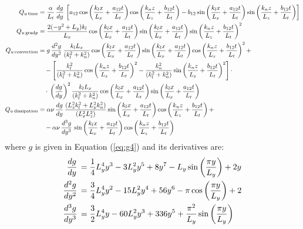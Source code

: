 \documentclass[10pt]{article}
\newcommand{\convection}{\,\text{convection}}
\newcommand{\gradp}{\,\text{grad}p}
\newcommand{\dissipation}{\,\text{dissipation}}
\begin{document}
\begin{equation*}
\begin{split}
Q_{u \,\text{time}} &=\dfrac{\alpha}{L_t} \,\dfrac{dg}{dy}\,\left[a_{12} \cos\left(\dfrac{k_l x}{L_x}+\dfrac{a_{12} t}{L_t} \right) \cos\left(\dfrac{k_n z}{L_z}+\dfrac{b_{12} t}{L_t} \right)-b_{12} \sin\left(\dfrac{k_l x}{L_x}+\dfrac{a_{12} t}{L_t} \right) \sin\left(\dfrac{k_n z}{L_z}+\dfrac{b_{12} t}{L_t} \right)\right] \vspace{8pt}\\ 
%
Q_{u \gradp} &=\dfrac{2 (-y^2+L_y) k_l}{L_x} \cos\left(\dfrac{k_l x}{L_x}+\dfrac{a_{12} t}{L_t} \right) \sin\left(\dfrac{k_l x}{L_x}+\dfrac{a_{12} t}{L_t} \right) \sin\left(\dfrac{k_n z}{L_z}+\dfrac{b_{12} t}{L_t} \right)^2 \vspace{8pt}\\ 
%
Q_{u \convection} &=  g \,\dfrac{d^2g}{dy^2}\, \dfrac{k_l L_x}{(k_l^2+k_n^2)} \cos\left(\dfrac{k_l x}{L_x}+\dfrac{a_{12} t}{L_t} \right) \sin\left(\dfrac{k_l x}{L_x}+\dfrac{a_{12} t}{L_t} \right) \cos\left(\dfrac{k_n z}{L_z}+\dfrac{b_{12} t}{L_t} \right)^2+\\
	&\quad-\left[ \dfrac{k_l^2}{(k_l^2+k_n^2)} \cos\left(\dfrac{k_n z}{L_z}+\dfrac{b_{12} t}{L_t} \right)^2-\dfrac{k_n^2}{(k_l^2+k_n^2)} \sin\left(\dfrac{k_n z}{L_z}+\dfrac{b_{12} t}{L_t} \right)^2 \right] \cdot\\
	&\quad\cdot\,\left(\dfrac{dg}{dy}\right)^2 \dfrac{k_l L_x}{(k_l^2+k_n^2)} \cos\left(\dfrac{k_l x}{L_x}+\dfrac{a_{12} t}{L_t} \right) \sin\left(\dfrac{k_l x}{L_x}+\dfrac{a_{12} t}{L_t} \right)\vspace{8pt}\\ 
%
 Q_{u \dissipation} &=  \alpha \nu \,\dfrac{dg}{dy}\, \dfrac{(L_z^2 k_l^2+L_x^2 k_n^2)}{(L_x^2 L_z^2)} \sin\left(\dfrac{k_l x}{L_x}+\dfrac{a_{12} t}{L_t} \right) \cos\left(\dfrac{k_n z}{L_z}+\dfrac{b_{12} t}{L_t} \right)+\\
	&\quad-\alpha \nu \,\dfrac{d^3g}{dy^3}\, \sin\left(\dfrac{k_l x}{L_x}+\dfrac{a_{12} t}{L_t} \right) \cos\left(\dfrac{k_n z}{L_z}+\dfrac{b_{12} t}{L_t} \right)
\end{split}
\end{equation*}
%
where $g$ is given in Equation (\ref{eq:g4}) and its derivatives are:
\begin{equation}
\begin{split}\label{eq:derivative_g}
\dfrac{dg}{dy}\, &= \dfrac{1}{4}L_y^4 y^3-3 L_y^2 y^5+8 y^7-L_y \sin\left(\dfrac{\pi y}{L_y} \right)+2 y\vspace{8pt}\\
%
\dfrac{d^2g}{dy^2}\, &= \dfrac{3}{4} L_y^4 y^2 -15 L_y^2 y^4+56 y^6-\pi \cos\left(\dfrac{\pi y}{L_y} \right)+2\vspace{8pt}\\
%
\dfrac{d^3g}{dy^3}\, &=  \dfrac{3}{2} L_y^4 y-60 L_y^2 y^3+336 y^5+\dfrac{\pi^2}{L_y} \sin\left(\dfrac{\pi y}{L_y} \right)
\end{split}
\end{equation}
\end{document}
